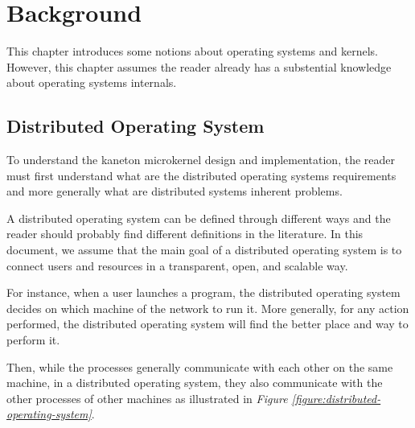 %
%
%
%
%
%

%
%

\chapter{Background}
\label{chapter:background}

This chapter introduces some notions about operating systems and kernels.
However, this chapter assumes the reader already has a substential knowledge
about operating systems internals.

\newpage

%
%

%
%

\section{Distributed Operating System}

To understand the kaneton microkernel design and implementation, the reader
must first understand what are the distributed operating systems requirements
and more generally what are distributed systems inherent problems.

A distributed operating system can be defined through different ways and
the reader should probably find different definitions in the literature. In
this document, we assume that the main goal of a distributed operating
system is to connect users and resources in a transparent, open, and scalable
way.

For instance, when a user launches a program, the distributed operating system
decides on which machine of the network to run it. More generally, for
any action performed, the distributed operating system will find the better
place and way to perform it.

Then, while the processes generally communicate with each other on the same
machine, in a distributed operating system, they also communicate with the
other processes of other machines as illustrated in \textit{Figure
\ref{figure:distributed-operating-system}}.

